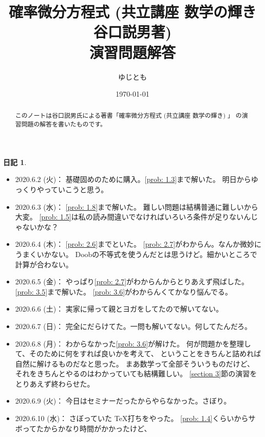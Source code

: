 \documentclass[uplatex]{jsarticle}
\theoremstyle{definition}
\newtheorem*{nikki*}{日記}
\begin{document}
\title{確率微分方程式 (共立講座 数学の輝き 谷口説男著) \\
演習問題解答}
\date{\today}
\author{ゆじとも}

\maketitle

\begin{abstract}
  このノートは谷口説男氏による著書「確率微分方程式 (共立講座 数学の輝き) 」
  の演習問題の解答を書いたものです。
\end{abstract}

\tableofcontents


\begin{nikki*}
  \begin{itemize}
    \item 2020.6.2 (火)：
    基礎固めのために購入。\autoref{prob: 1.3}まで解いた。
    明日からゆっくりやっていこうと思う。
    \item 2020.6.3 (水)：
    \autoref{prob: 1.8}まで解いた。
    難しい問題は結構普通に難しいから大変。
    \autoref{prob: 1.5}は私の読み間違いでなければいろいろ条件が足りないんじゃないかな？
    \item 2020.6.4 (木)：
    \autoref{prob: 2.6}までといた。
    \autoref{prob: 2.7}がわからん。なんか微妙にうまくいかない。
    Doobの不等式を使うんだとは思うけど。細かいところで計算が合わない。
    \item 2020.6.5 (金)：
    やっぱり\autoref{prob: 2.7}がわからんからとりあえず飛ばした。
    \autoref{prob: 3.5}まで解いた。
    \autoref{prob: 3.6}がわからんくてかなり悩んでる。
    \item 2020.6.6 (土)：
    実家に帰って親とヨガをしてたので解いてない。
    \item 2020.6.7 (日)：
    完全にだらけてた。一問も解いてない。何してたんだろ。
    \item 2020.6.8 (月)：
    わからなかった\autoref{prob: 3.6}が解けた。
    何が問題かを整理して、そのために何をすれば良いかを考えて、
    ということをきちんと詰めれば自然に解けるものだなと思った。
    まあ数学って全部そういうものだけど、
    それをきちんとやるのはわかっていても結構難しい。
    \ref{section 3}節の演習をとりあえず終わらせた。
    \item 2020.6.9 (火)：
    今日はセミナーだったからやらなかった。さぼり。
    \item 2020.6.10 (水)：
    さぼっていた \TeX 打ちをやった。
    \autoref{prob: 1.4}くらいからサボってたからかなり時間がかかったけど、

\end{itemize}
\end{nikki*}
\end{document}

